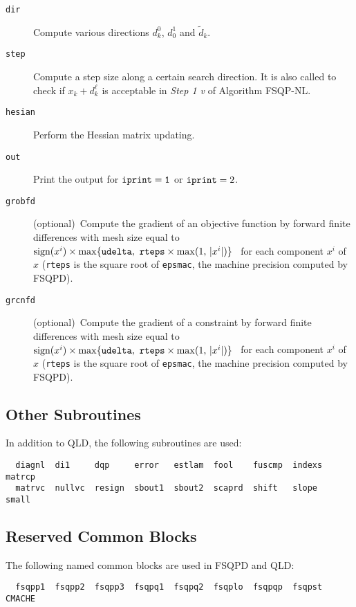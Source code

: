 \begin{description}
\item[\tt dir] Compute various directions $d_k^0$, $d^1_0$ and $\tilde d_k$.
\item[\tt step]Compute a step size along a certain search direction. 
               It is also called to check if $x_k+d_k^\ell$ is acceptable 
               in {\it Step 1 v} of Algorithm FSQP-NL.
\item[\tt hesian] Perform the Hessian matrix updating.
\item[\tt out] Print the output for ${\tt iprint=1}$ 
                  or ${\tt iprint}=2$.
\item[\tt grobfd] (optional)~Compute the gradient of an objective 
                function 
                by forward finite differences with mesh size equal to 
$\mbox{sign}(x^i)\times\max \{{\tt udelta},~
               {\tt rteps}\times\max (1,\,|x^i|)\}$~
                for each component $x^i$ of $x$ ({\tt rteps} is the 
                square root of {\tt epsmac}, the machine 
                precision computed by FSQPD).
\item[\tt grcnfd]  (optional)~Compute the gradient of a constraint by 
                   forward finite differences with mesh size equal to 
$\mbox{sign}(x^i)\times\max \{{\tt udelta},~
                {\tt rteps}\times\max (1,\,|x^i|)\}$~
                for each component $x^i$ of $x$ ({\tt rteps} is the 
                square root of {\tt epsmac}, the machine 
                precision computed by FSQPD).
\end{description}

\subsection{Other Subroutines}
In addition to QLD, the following subroutines are used:
\begin{verbatim}
  diagnl  di1     dqp     error   estlam  fool    fuscmp  indexs  matrcp
  matrvc  nullvc  resign  sbout1  sbout2  scaprd  shift   slope   small
\end{verbatim}

\subsection{Reserved Common Blocks}
The following named common blocks are used in FSQPD and QLD:
\begin{verbatim}
  fsqpp1  fsqpp2  fsqpp3  fsqpq1  fsqpq2  fsqplo  fsqpqp  fsqpst  CMACHE
\end{verbatim}



